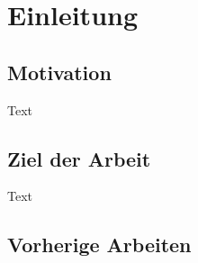 \chapter{Einleitung}
\label{ch:einleitung}

\section{Motivation}
\label{sec:motivation}

Text

\section{Ziel der Arbeit}
\label{sec:ziel}
Text

\section{Vorherige Arbeiten}
\label{sec:gliederung}
